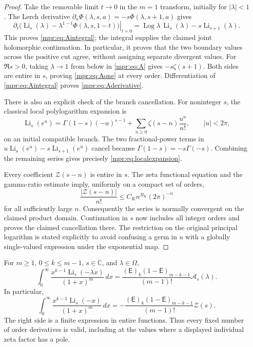 \begin{proof}
Take the removable limit $t\to0$ in the $m=1$ transform, initially for
$|\lambda|<1$.  The Lerch derivative
$\partial_a\Phi(\lambda,s,a)=-s\Phi(\lambda,s+1,a)$ gives
\[
 \left.\partial_t
       \bigl(\operatorname{Li}_s(\lambda)
             -\lambda^{1-t}\Phi(\lambda,s,1-t)\bigr)\right|_{t=0}
 =\operatorname{Log}\lambda\,\operatorname{Li}_s(\lambda)
                         -s\operatorname{Li}_{s+1}(\lambda).
\]
This proves \eqref{mpr:eq:Aintegral}; the integral supplies the claimed
joint holomorphic continuation.  In particular, it proves that the two
boundary values across the positive cut agree, without assigning separate
divergent values.  For $\Re s>0$, taking $\lambda\to1$ from below in
\eqref{mpr:eq:A} gives $-s\zeta(s+1)$.  Both sides are entire in $s$,
proving \eqref{mpr:eq:Aone} at every order.  Differentiation of
\eqref{mpr:eq:Aintegral} proves \eqref{mpr:eq:Aderivative}.

There is also an explicit check of the branch cancellation.  For
noninteger $s$, the classical local polylogarithm expansion
\cite[Eq.~25.12.12]{DLMFPolylog} is
\[
 \operatorname{Li}_s(e^u)
  =\Gamma(1-s)(-u)^{s-1}
      +\sum_{n\ge0}\zeta(s-n)\frac{u^n}{n!},\qquad |u|<2\pi,
\]
on an initial compatible branch.  The two fractional-power terms in
$u\operatorname{Li}_s(e^u)-s\operatorname{Li}_{s+1}(e^u)$ cancel
because $\Gamma(1-s)=-s\Gamma(-s)$.  Combining the remaining series
gives precisely \eqref{mpr:eq:localexpansion}.

Every coefficient $\mathscr Z(s-n)$ is entire in $s$.  The zeta
functional equation and the gamma-ratio estimate imply, uniformly on a
compact set of orders,
\[
 \frac{|\mathscr Z(s-n)|}{n!}
        \le C_K n^{B_K}(2\pi)^{-n}
\]
for all sufficiently large $n$.  Consequently the series is normally
convergent on the claimed product domain.  Continuation in $s$ now
includes all integer orders and proves the claimed cancellation there.
The restriction on the original principal logarithm is stated explicitly
to avoid confusing a germ in $u$ with a globally single-valued expression
under the exponential map.
\end{proof}

\begin{theorem}\label{mpr:thm:integer}
For $m\ge1$, $0\le k\le m-1$, $s\in\mathbb C$, and $\lambda\in\Omega$,
\begin{equation}\label{mpr:eq:integer}
 \boxed{\displaystyle
 \int_0^\infty\frac{x^{k-1}\operatorname{Li}_s(-\lambda x)}{(1+x)^m}\,dx
 =\frac{(\mathsf E)_k(1-\mathsf E)_{m-k-1}}{(m-1)!}
                                  \mathcal A_s(\lambda).}
\end{equation}
In particular,
\begin{equation}\label{mpr:eq:integerzeta}
 \int_0^\infty\frac{x^{k-1}\operatorname{Li}_s(-x)}{(1+x)^m}\,dx
 =-\frac{(\mathsf E)_k(1-\mathsf E)_{m-k-1}}{(m-1)!}
                                  \mathscr Z(s).
\end{equation}
The right side is a finite expression in entire functions.  Thus every
fixed number of order derivatives is valid, including at the values
where a displayed individual zeta factor has a pole.
\end{theorem}

